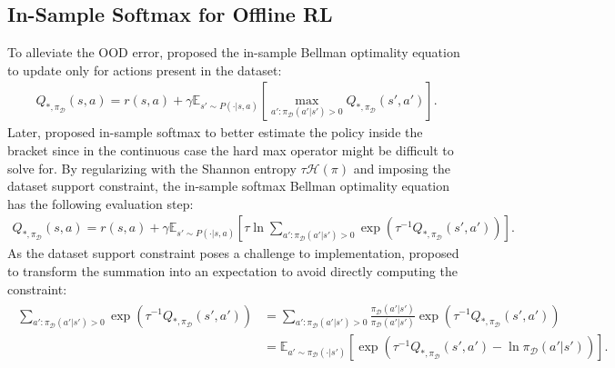 \documentclass{article}
\newcommand{\AdaBracket}[1]{\left(#1\right)}
\newcommand{\AdaRectBracket}[1]{\left[#1\right]}
\newcommand{\expectation}[2]{\mathbb{E}_{#1}\AdaRectBracket{#2}}
\newcommand{\entropy}{\mathcal{H}\left( \pi \right)}
\newcommand{\datasetOptimalQ}{Q_{*, \pi_{\mathcal{D}}}}
\newcommand{\datasetPolicy}{\pi_{\mathcal{D}}}
\begin{document}
\subsection{In-Sample Softmax for Offline RL}


To alleviate the OOD error, \citet{Fujimoto2019-InSampleMax} proposed the in-sample Bellman optimality equation to update only for actions present in the dataset:
\begin{align}
    \datasetOptimalQ(s,a) = r(s,a) + \gamma \expectation{s'\sim P(\cdot | s,a)}{\max_{a': \datasetPolicy(a'|s') > 0} \datasetOptimalQ(s',a')}.
    \label{eq:hardmax_offline}
\end{align}
Later, \citet{Xiao2023-InSampleSoftmax} proposed in-sample softmax to better estimate the policy inside the bracket since in the continuous case the hard max operator might be difficult to solve for.
By regularizing with the Shannon entropy $\tau \entropy$ and imposing the dataset support constraint, the in-sample softmax Bellman optimality equation has the following evaluation step:
\begin{align}
    \datasetOptimalQ (s,a) = r(s,a) +  \gamma \expectation{s'\sim P(\cdot | s,a)}{\tau \ln \!\!\!\!\!\sum_{a': \datasetPolicy(a'|s') > 0} \!\!\!\!\! \exp\AdaBracket{\tau^{-1} \datasetOptimalQ(s',a')}}.
\end{align}
As the dataset support constraint poses a challenge to implementation, \citet{Xiao2023-InSampleSoftmax} proposed to transform the summation into an expectation to avoid directly computing the constraint: 
\begin{align}
    \begin{split}
    \sum_{a': \datasetPolicy(a'|s') > 0} \!\!\!\!\!\!\exp\AdaBracket{\tau^{-1}\datasetOptimalQ (s',a')} &= \!\!\!\!\!\!\sum_{a': \datasetPolicy(a'|s') > 0} \frac{\datasetPolicy(a'|s')}{\datasetPolicy(a'|s')} \exp\AdaBracket{\tau^{-1}\datasetOptimalQ (s',a')} \\
    &= \expectation{a'\sim\datasetPolicy(\cdot | s')}{\exp\AdaBracket{\tau^{-1}\datasetOptimalQ (s',a') - \ln\datasetPolicy(a'|s')}}.
    \end{split}
\end{align}
\end{document}
